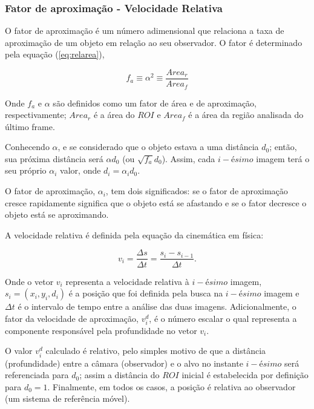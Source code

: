 \subsubsection{Fator de aproximação - Velocidade Relativa}

O fator de aproximação é um número adimensional que relaciona a taxa de 
aproximação de um objeto em relação ao seu observador.
O fator é determinado pela equação (\ref{eq:relarea}),

\begin{equation}\label{eq:relarea}
f_a \equiv \alpha^2 \equiv \frac{Area_r}{Area_f} 
\end{equation}

Onde $f_a$ e $\alpha$ são definidos como um fator de área e de aproximação,
respectivamente; $Area_r$ é a área do $ROI$ e $Area_f$ é a área da região analisada
do último frame.

Conhecendo $\alpha$, e se considerado que o objeto estava a uma distância $d_0$; então,
sua próxima distância será $\alpha d_0$ (ou $\sqrt{f_a} d_0$). Assim, cada $i-ésimo$ imagem
terá o seu próprio $\alpha_i$ valor, onde $d_i=\alpha_i d_0$.

O fator de aproximação, $\alpha_i$, tem dois significados: se o fator de aproximação cresce rapidamente 
significa que o objeto está se afastando e se o fator decresce o objeto está se aproximando.

A velocidade relativa é definida pela equação da cinemática em física:

\begin{equation}
 v_i = \frac{\Delta s}{\Delta t}= \frac{s_i-s_{i-1}}{\Delta t}.
\end{equation}

Onde o vetor $v_i$ representa a velocidade relativa à $i-ésimo$ imagem, $s_i=(x_i,y_i,d_i)$ é a posição que
foi definida pela busca na $i-ésimo$ imagem e $\Delta t$ é o intervalo de tempo entre a análise das duas imagens.
Adicionalmente, o fator da velocidade de aproximação, $v^d_i$, é o número escalar o qual representa a componente
responsável pela profundidade no vetor $v_i$.

O valor $v^d_i$ calculado é relativo, pelo simples motivo de que a distância (profundidade) entre a câmara 
(observador) e o alvo no instante $i-ésimo$ será referenciada para $d_0$; assim a distância do $ROI$ 
inicial é estabelecida por definição para $d_0=1$. Finalmente, em todos os casos, a posição é 
relativa ao observador (um sistema de referência móvel).

